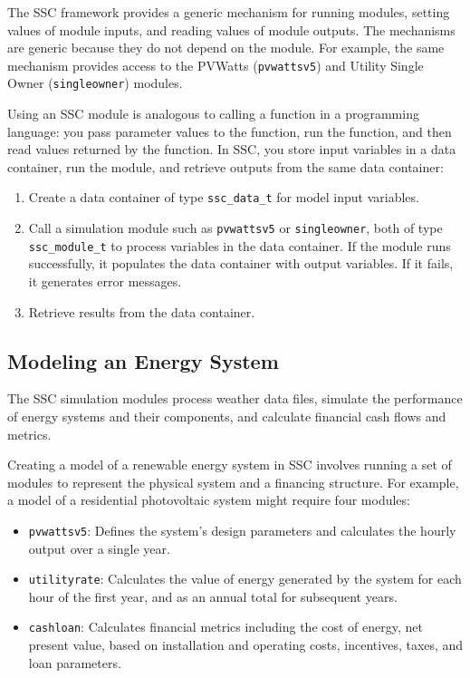\documentclass{scrartcl} %
\newcommand{\+}{\discretionary{\mbox{\scriptsize$\hookleftarrow$}}{}{}}
\begin{document}
The SSC framework provides a generic mechanism for running modules, setting values of module inputs, and reading values of module outputs. The mechanisms are generic because they do not depend on the module. For example, the same mechanism provides access to the PVWatts (\texttt{pvwattsv5}) and Utility Single Owner (\texttt{singleowner}) modules.  

Using an SSC module is analogous to calling a function in a programming language: you pass parameter values to the function, run the function, and then read values returned by the function.  In SSC, you store input variables in a data container, run the module, and retrieve outputs from the same data container:

\begin{enumerate}
\item Create a data container of type \texttt{ssc\_data\_t} for model input variables.
\item Call a simulation module such as \texttt{pvwattsv5} or \texttt{singleowner}, both of type \texttt{ssc\_module\_t} to process variables in the data container. If the module runs successfully, it populates the data container with output variables. If it fails, it generates error messages.
\item Retrieve results from the data container.
\end{enumerate}

\subsection{Modeling an Energy System}
\label{sec_modeling_systems}

The SSC simulation modules process weather data files, simulate the performance of energy systems and their components, and calculate financial cash flows and metrics.

Creating a model of a renewable energy system in SSC involves running a set of modules to represent the physical system and a financing structure. For example, a model of a residential photovoltaic system might require four modules:

\begin{itemize}
\item \texttt{pvwattsv5}: Defines the system's design parameters and calculates the hourly output over a single year.
\item \texttt{utilityrate}: Calculates the value of energy generated by the system for each hour of the first year, and as an annual total for subsequent years.
\item \texttt{cashloan}: Calculates financial metrics including the cost of energy, net present value, based on installation and operating costs, incentives, taxes, and loan parameters.
\end{itemize}
\end{document}
